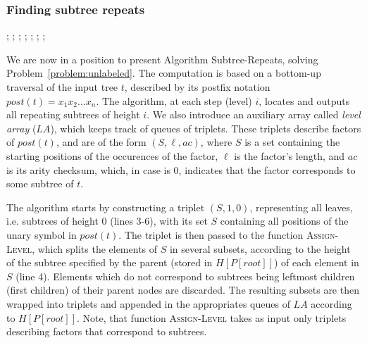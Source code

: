 \documentclass[preprint,12pt]{elsarticle}
\begin{document}
\subsubsection{Finding subtree repeats}


\begin{algorithm}\label{alg SR}
\begin{algorithmic}[1]
 ;
   ;
   ;
   ; 
  \ELSE
   ;
   ;
  \ENDIF
 \ENDFOR
  \ENDWHILE
 \ENDFOR
 ;
\end{algorithmic}
\end{algorithm}



We are now in a position to present Algorithm {\sc Subtree-Repeats}, solving Problem~\ref{problem:unlabeled}. The computation is based on a bottom-up traversal of the input tree $t$, described by its postfix notation $\textit{post}(t)=x_1 x_2 \ldots x_n$.
The algorithm, at each step (level) $i$, locates and outputs all repeating subtrees of height $i$.
We also introduce an auxiliary array called \emph{level array} ($\textit{LA}$), which keeps track of queues of triplets.
These triplets describe factors of $\textit{post}(t)$, and are of the form $(S,\ell,\textit{ac})$, where  $S$ is a set containing the starting 
positions of the occurences of the factor, $\ell$ is the factor's length, and $\textit{ac}$ is its arity checksum, which, in case is $0$,
indicates that the factor corresponds to some subtree of $t$. 

The algorithm starts by constructing a triplet $(S,1,0)$, representing all leaves, i.e. subtrees of height $0$ (lines 3-6),
with its set $S$ containing all positions of the unary symbol in $\textit{post}(t)$.
The triplet is then passed to the function \textsc{Assign-Level}, which splits the elements of $S$ in several subsets,
according to the height of the subtree specified by the parent (stored in $H[P[\textit{root}]]$) of each element in $S$ (line 4). Elements which do not correspond to subtrees being 
leftmost children (first children) of their parent nodes are discarded. The resulting subsets are then wrapped into triplets and appended 
in the appropriates queues of $\textit{LA}$ according to $H[P[\textit{root}]]$. Note, that function \textsc{Assign-Level} takes as input only triplets describing factors that 
correspond to subtrees.
\end{document}
